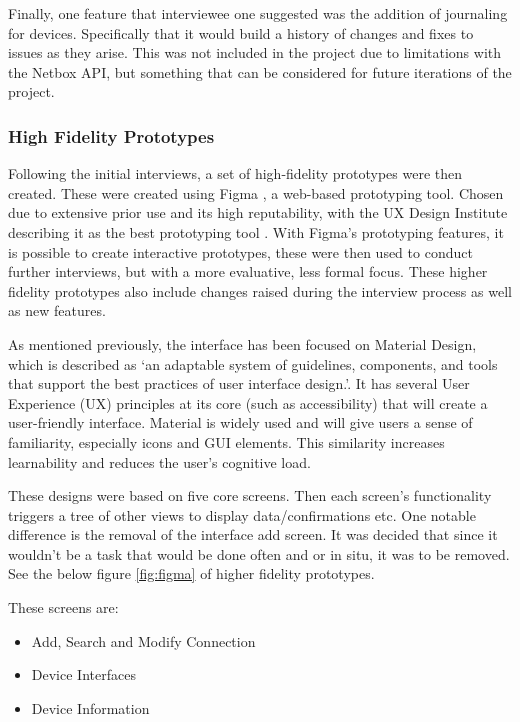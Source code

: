 \documentclass [11pt,a4paper]{article}
\begin{document}
Finally, one feature that interviewee one suggested was the addition of journaling for devices. Specifically that it would build a history of changes and fixes to issues as they arise. This was not included in the project due to limitations with the Netbox API, but something that can be considered for future iterations of the project.


\subsubsection{High Fidelity Prototypes}
\label{sec:ui_design_high_fidelity_prototypes}

Following the initial interviews, a set of high-fidelity prototypes were then created. These were created using Figma \cite{figma}, a web-based prototyping tool. Chosen due to extensive prior use and its high reputability, with the UX Design Institute describing it as the best prototyping tool \cite{figmaUX}. With Figma's prototyping features, it is possible to create interactive prototypes, these were then used to conduct further interviews, but with a more evaluative, less formal focus. These higher fidelity prototypes also include changes raised during the interview process as well as new features.

As mentioned previously, the interface has been focused on Material Design, which is described as `an adaptable system of guidelines, components, and tools that support the best practices of user interface design.'\cite{materialDesign}. It has several User Experience (UX) principles at its core (such as accessibility) that will create a user-friendly interface. Material is widely used and will give users a sense of familiarity, especially icons and GUI elements. This similarity increases learnability and reduces the user's cognitive load.

These designs were based on five core screens. Then each screen's functionality triggers a tree of other views to display data/confirmations etc. One notable difference is the removal of the interface add screen. It was decided that since it wouldn't be a task that would be done often and or in situ, it was to be removed. See the below figure \ref{fig:figma} of higher fidelity prototypes. 

These screens are:
\begin{itemize}[topsep=0pt]
    \item Add, Search and Modify Connection
    \item Device Interfaces
    \item Device Information
\end{itemize}
\end{document}
